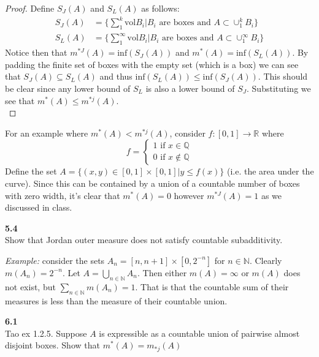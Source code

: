 \documentclass[12pt]{article}
\newcommand{\problem}[1]{\hspace{-4 ex} \large \textbf{#1}\\}
\begin{document}
	\begin{proof}
		Define $S_J(A)$ and $S_L(A)$ as follows:
		\begin{align*}
			S_J(A) & = \Bigg\{\sum_1^k\text{vol}B_i \Bigg \vert B_i \text{ are boxes and } A \subset \cup_1^k B_i \Bigg\} \\
			S_L(A) & = \Bigg\{\sum_1^\infty\text{vol}B_i \Bigg \vert B_i \text{ are boxes and } A \subset \cup_1^\infty B_i \Bigg\}
		\end{align*}
	Notice then that $m^{*J}(A) = \text{inf}(S_J(A))$ and $m^{*}(A) = \text{inf}(S_L(A))$. By padding the finite set of boxes with the empty set (which is a box) we can see that $S_J(A) \subseteq S_L(A)$ and thus $\text{inf}(S_L(A)) \leq \text{inf}(S_J(A))$. This should be clear since any lower bound of $S_L$ is also a lower bound of $S_J$. Substituting we see that $m^*(A)\leq m^{*j}(A)$. \\
	\end{proof}

	For an example where $m^*(A)<m^{*j}(A)$, consider $f: [0,1] \to \mathbb{R}$ where
	\[
		f = 
			\begin{cases}
				1 \text{ if } x \in \mathbb{Q} \\
				0 \text{ if } x \notin \mathbb{Q}
			\end{cases}
	\]
	Define the set $A = \{(x,y) \in [0,1] \times [0,1] \vert y \leq f(x)\}$ (i.e. the area under the curve). Since this can be contained by a union of a countable number of boxes with zero width, it's clear that $m^*(A) = 0$ however $m^{*J}(A) = 1$ as we discussed in class.


\problem{5.4} Show that Jordan outer measure does not satisfy countable subadditivity.

	\textit{Example:} consider the sets $A_n = [n,n+1] \times [0, 2^{-n}]$ for $n \in \mathbb{N}$. Clearly $m(A_n) = 2^{-n}$. Let $A = \bigcup\limits_{n \in \mathbb{N}}A_n$. Then either $m(A) = \infty$ or $m(A)$ does not exist, but $\sum\limits_{n \in \mathbb{N}}m(A_n) = 1$. That is that the countable sum of their measures is less than the measure of their countable union.



\problem{6.1}Tao ex 1.2.5. Suppose $A$ is expressible as a countable union of pairwise almost disjoint boxes. Show that $m^*(A)=m_{*j}(A)$
\end{document}
